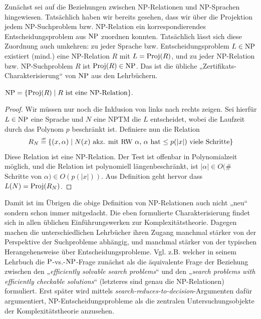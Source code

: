 Zunächst sei auf die Beziehungen zwischen NP-Relationen und NP-Sprachen hingewiesen.
Tatsächlich haben wir bereits gesehen, dass wir über die Projektion jedem NP-Suchproblem bzw. NP-Relation ein korrespondierendes Entscheidungsproblem aus $\NP$ zuordnen konnten. Tatsächlich lässt sich diese Zuordnung auch umkehren: zu jeder Sprache bzw. Entscheidungsproblem $L\in \NP$ existiert (mind.) eine NP-Relation $R$ mit $L=\Proj(R)$, und zu jeder NP-Relation bzw. NP-Suchproblem $R$ ist $\Proj(R)\in\NP$. Das ist die übliche „Zertifikats-Charakterisierung“ von $\NP$ aus den Lehrbüchern.
\begin{observation}\label{obs:np-certificate-def}
    $\NP = \{ \Proj(R) \mid \text{$R$ ist eine NP-Relation} \}.$
\end{observation}
\begin{proof}
    Wir müssen nur noch die Inklusion von links nach rechts zeigen. Sei hierfür $L\in\NP$ eine Sprache und $N$ eine NPTM die $L$ entscheidet, wobei die Laufzeit durch das Polynom $p$ beschränkt ist. Definiere nun die Relation
    \[ R_N  \defeq \{ (x, \alpha) \mid \text{$N(x)$ akz. mit RW $\alpha$, $\alpha$ hat $\leq p(|x|)$ viele Schritte} \} \]
    Diese Relation ist eine NP-Relation. Der Test ist offenbar in Polynomialzeit möglich, und die Relation ist polynomiell längenbeschränkt, ist $|\alpha|\in O($\# Schritte von $\alpha)\in O(p(|x|))$.
    Aus Definition geht hervor dass $L(N) = \Proj(R_N)$.
\end{proof}
Damit ist im Übrigen die obige Definition von NP-Relationen auch nicht „neu“ sondern schon immer mitgedacht. Die eben formulierte Charakterisierung findet sich in allen üblichen Einführungswerken zur Komplexitätstheorie. Dagegen machen die unterschiedlichen Lehrbücher ihren Zugang manchmal stärker von der Perspektive der Suchprobleme abhängig, und manchmal stärker von der typischen Herangehensweise über Entscheidungsprobleme.
Vgl. z.B. \textcite{goldreich_computational_2008} welcher in seinem Lehrbuch die $\P$-vs.-$\NP$-Frage zunächst als die äquivalente Frage der Beziehung zwischen den „\emph{efficiently solvable search problems}“ und den „\emph{search problems with efficiently checkable solutions}“ (letzteres sind genau die NP-Relationen) formuliert. Erst später wird mittels \emph{search-reduces-to-decision}-Argumenten dafür argumentiert, NP-Entscheidungsprobleme als die zentralen Untersuchungsobjekte der Komplexitätstheorie anzusehen.


